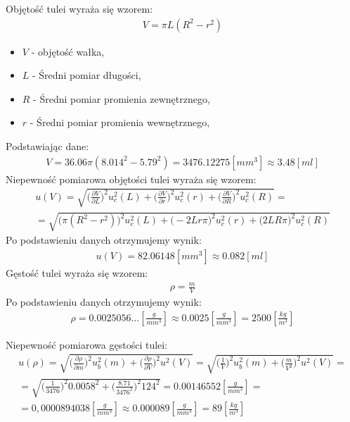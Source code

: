 \documentclass[11pt]{article}
\begin{document}
    \noindent Objętość tulei wyraża się wzorem:
    \begin{gather*}
        V = \pi L(R^2 -r^2)
    \end{gather*}
    {\footnotesize
        \begin{itemize}
            \setlength\itemsep{0.1em}
            \item[] $V$ - objętość wałka,
            \item[] $L$ - Średni pomiar długości,
            \item[] $R$ - Średni pomiar promienia zewnętrznego,
            \item[] $r$ - Średni pomiar promienia wewnętrznego,
        \end{itemize}
    }
    \noindent Podstawiając dane:
    \begin{gather*}
        V =  36.06\pi(8.014^2 - 5.79^2)=3476.12275[mm^3]\approx 3.48 [ml]
    \end{gather*}
    \noindent Niepewność pomiarowa objętości tulei wyraża się wzorem:
    \begin{gather*}
        u(V) = \sqrt{\biggl(\frac{\partial V}{\partial L}\biggr)^2 u_c^2(L)+
                {\biggl(\frac{\partial V}{\partial r}\biggr)^2 u_c^2(r)}+
                { \biggl(\frac{\partial V}{\partial R}\biggr)^2 u_c^2(R)}}=\\
        =\sqrt{{ \biggl( \pi(R^2 - r^2) \biggr)^2 u_c^2(L)}+
                {\biggl(-2Lr\pi \biggr)^2 u_c^2(r)}+
                {\biggl(2LR\pi \biggr)^2 u_c^2(R)}}
    \end{gather*}
    \noindent Po podstawieniu danych otrzymujemy wynik:
    \begin{gather*}
        u(V)=82.06148[mm^3]\approx 0.082[ml]
    \end{gather*}
    \noindent Gęstość tulei wyraża się wzorem:
    \begin{gather*}
        \rho=\frac{m}{V}
    \end{gather*}
    \noindent Po podstawieniu danych otrzymujemy wynik:
    \begin{gather*}
        \rho=0.0025056\dots[\frac{g}{mm^3}]\approx 0.0025 [\frac{g}{mm^3}] = 2500 [\frac{kg}{m^3}]
    \end{gather*}

    \noindent Niepewność pomiarowa gęstości tulei:
    \begin{gather*}
        u(\rho)=\sqrt{\biggl(\frac{\partial \rho}{\partial m}\biggr)^2u_b^2(m)+
        \biggl(\frac{\partial \rho}{\partial V}\biggr)^2u^2(V)}
        =\sqrt{\biggl(\frac{1}{V} \biggr)^2u_b^2(m)+
        \biggl(\frac{m}{V^2}\biggr)^2u^2(V)}=\\
        =\sqrt{\biggl(\frac{1}{3476} \biggr)^2 0.0058^2+
        \biggl(\frac{8.71}{3476^2}\biggr)^2 124^2}=0.00146552[\frac{g}{mm^3}]=\\
        =0,0000894038[\frac{g}{mm^3}]\approx 0.000089[\frac{g}{mm^3}]= 89 [\frac{kg}{m^3}]
    \end{gather*}
\end{document}
